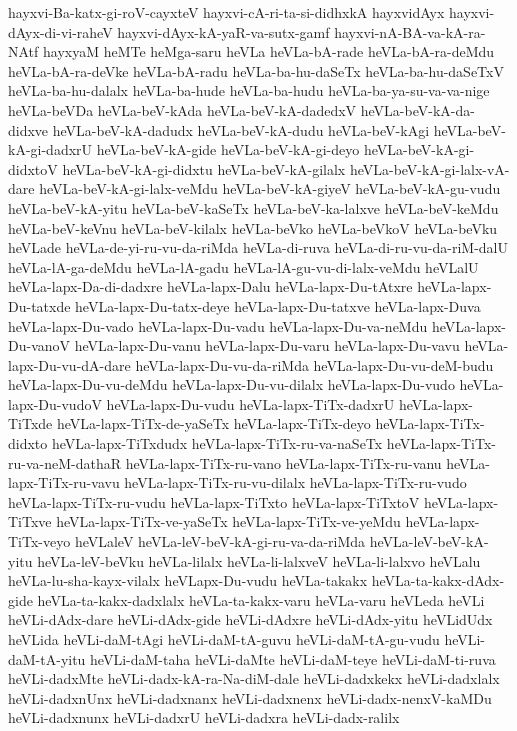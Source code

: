 {hayxvi-Ba-katx-gi-roV-cayxteV
hayxvi-cA-ri-ta-si-didhxkA
hayxvidAyx
hayxvi-dAyx-di-vi-raheV
hayxvi-dAyx-kA-yaR-va-sutx-gamf
hayxvi-nA-BA-va-kA-ra-NAtf
hayxyaM
heMTe
heMga-saru
heVLa
heVLa-bA-rade
heVLa-bA-ra-deMdu
heVLa-bA-ra-deVke
heVLa-bA-radu
heVLa-ba-hu-daSeTx
heVLa-ba-hu-daSeTxV
heVLa-ba-hu-dalalx
heVLa-ba-hude
heVLa-ba-hudu
heVLa-ba-ya-su-va-va-nige
heVLa-beVDa
heVLa-beV-kAda
heVLa-beV-kA-dadedxV
heVLa-beV-kA-da-didxve
heVLa-beV-kA-dadudx
heVLa-beV-kA-dudu
heVLa-beV-kAgi
heVLa-beV-kA-gi-dadxrU
heVLa-beV-kA-gide
heVLa-beV-kA-gi-deyo
heVLa-beV-kA-gi-didxtoV
heVLa-beV-kA-gi-didxtu
heVLa-beV-kA-gilalx
heVLa-beV-kA-gi-lalx-vA-dare
heVLa-beV-kA-gi-lalx-veMdu
heVLa-beV-kA-giyeV
heVLa-beV-kA-gu-vudu
heVLa-beV-kA-yitu
heVLa-beV-kaSeTx
heVLa-beV-ka-lalxve
heVLa-beV-keMdu
heVLa-beV-keVnu
heVLa-beV-kilalx
heVLa-beVko
heVLa-beVkoV
heVLa-beVku
heVLade
heVLa-de-yi-ru-vu-da-riMda
heVLa-di-ruva
heVLa-di-ru-vu-da-riM-dalU
heVLa-lA-ga-deMdu
heVLa-lA-gadu
heVLa-lA-gu-vu-di-lalx-veMdu
heVLalU
heVLa-lapx-Da-di-dadxre
heVLa-lapx-Dalu
heVLa-lapx-Du-tAtxre
heVLa-lapx-Du-tatxde
heVLa-lapx-Du-tatx-deye
heVLa-lapx-Du-tatxve
heVLa-lapx-Duva
heVLa-lapx-Du-vado
heVLa-lapx-Du-vadu
heVLa-lapx-Du-va-neMdu
heVLa-lapx-Du-vanoV
heVLa-lapx-Du-vanu
heVLa-lapx-Du-varu
heVLa-lapx-Du-vavu
heVLa-lapx-Du-vu-dA-dare
heVLa-lapx-Du-vu-da-riMda
heVLa-lapx-Du-vu-deM-budu
heVLa-lapx-Du-vu-deMdu
heVLa-lapx-Du-vu-dilalx
heVLa-lapx-Du-vudo
heVLa-lapx-Du-vudoV
heVLa-lapx-Du-vudu
heVLa-lapx-TiTx-dadxrU
heVLa-lapx-TiTxde
heVLa-lapx-TiTx-de-yaSeTx
heVLa-lapx-TiTx-deyo
heVLa-lapx-TiTx-didxto
heVLa-lapx-TiTxdudx
heVLa-lapx-TiTx-ru-va-naSeTx
heVLa-lapx-TiTx-ru-va-neM-dathaR
heVLa-lapx-TiTx-ru-vano
heVLa-lapx-TiTx-ru-vanu
heVLa-lapx-TiTx-ru-vavu
heVLa-lapx-TiTx-ru-vu-dilalx
heVLa-lapx-TiTx-ru-vudo
heVLa-lapx-TiTx-ru-vudu
heVLa-lapx-TiTxto
heVLa-lapx-TiTxtoV
heVLa-lapx-TiTxve
heVLa-lapx-TiTx-ve-yaSeTx
heVLa-lapx-TiTx-ve-yeMdu
heVLa-lapx-TiTx-veyo
heVLaleV
heVLa-leV-beV-kA-gi-ru-va-da-riMda
heVLa-leV-beV-kA-yitu
heVLa-leV-beVku
heVLa-lilalx
heVLa-li-lalxveV
heVLa-li-lalxvo
heVLalu
heVLa-lu-sha-kayx-vilalx
heVLapx-Du-vudu
heVLa-takakx
heVLa-ta-kakx-dAdx-gide
heVLa-ta-kakx-dadxlalx
heVLa-ta-kakx-varu
heVLa-varu
heVLeda
heVLi
heVLi-dAdx-dare
heVLi-dAdx-gide
heVLi-dAdxre
heVLi-dAdx-yitu
heVLidUdx
heVLida
heVLi-daM-tAgi
heVLi-daM-tA-guvu
heVLi-daM-tA-gu-vudu
heVLi-daM-tA-yitu
heVLi-daM-taha
heVLi-daMte
heVLi-daM-teye
heVLi-daM-ti-ruva
heVLi-dadxMte
heVLi-dadx-kA-ra-Na-diM-dale
heVLi-dadxkekx
heVLi-dadxlalx
heVLi-dadxnUnx
heVLi-dadxnanx
heVLi-dadxnenx
heVLi-dadx-nenxV-kaMDu
heVLi-dadxnunx
heVLi-dadxrU
heVLi-dadxra
heVLi-dadx-ralilx
}
